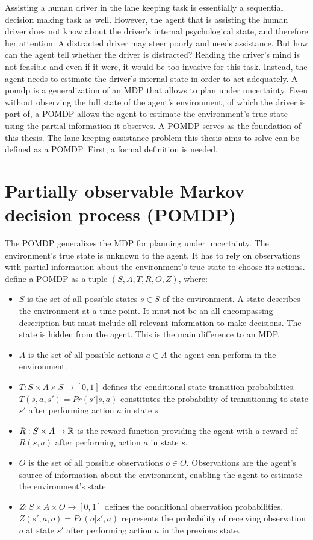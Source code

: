 Assisting a human driver in the lane keeping task is essentially a sequential decision making task as well. However, the agent that is assisting the human driver does not know about the driver's internal psychological state, and therefore her attention. A distracted driver may steer poorly and needs assistance. But how can the agent tell whether the driver is distracted? Reading the driver's mind is not feasible and even if it were, it would be too invasive for this task. Instead, the agent needs to estimate the driver's internal state in order to act adequately. A \Gls{pomdp} is a generalization of an MDP that allows to plan under uncertainty. Even without observing the full state of the agent's environment, of which the driver is part of, a POMDP allows the agent to estimate the environment's true state using the partial information it observes. A POMDP serves as the foundation of this thesis. The lane keeping assistance problem this thesis aims to solve can be defined as a POMDP. First, a formal definition is needed.

\section{Partially observable Markov decision process (POMDP)}
\label{def:pomdp}

The POMDP generalizes the MDP for planning under uncertainty. The environment's true state is unknown to the agent. It has to rely on observations with partial information about the environment's true state to choose its actions. \cite{pomdp-definition} define a POMDP as a tuple $(S, A, T, R, O, Z)$, where:
\begin{itemize}
    \item $S$ is the set of all possible states $s \in S$ of the environment. A state describes the environment at a time point. It must not be an all-encompassing description but must include all relevant information to make decisions. The state is hidden from the agent. This is the main difference to an MDP.
    \item $A$ is the set of all possible actions $a \in A$ the agent can perform in the environment.
    \item $T : S \times A \times S \rightarrow [0,1]$ defines the conditional state transition probabilities. $T(s,a,s') = Pr(s' | s, a)$ constitutes the probability of transitioning to state $s'$ after performing action $a$ in state $s$.
    \item $R : S \times A \rightarrow \mathbb{R}$ is the reward function providing the agent with a reward of $R(s,a)$ after performing action $a$ in state $s$.
    \item $O$ is the set of all possible observations $o \in O$. Observations are the agent's source of information about the environment, enabling the agent to estimate the environment's state.
    \item $Z : S \times A \times O \rightarrow [0,1]$ defines the conditional observation probabilities. $Z(s', a, o) = Pr(o | s', a)$ represents the probability of receiving observation $o$ at state $s'$ after performing action $a$ in the previous state. 
\end{itemize}

